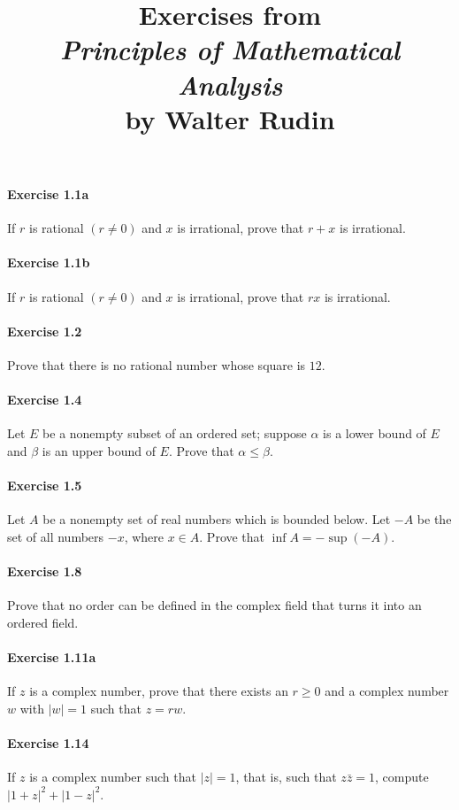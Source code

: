 \documentclass{article}
\title{\textbf{
Exercises from \\
\textit{Principles of Mathematical Analysis} \\
by Walter Rudin
}}
\date{}
\begin{document}
\maketitle

\paragraph{Exercise 1.1a} If $r$ is rational $(r \neq 0)$ and $x$ is irrational, prove that $r+x$ is irrational.

\paragraph{Exercise 1.1b} If $r$ is rational $(r \neq 0)$ and $x$ is irrational, prove that $rx$ is irrational.

\paragraph{Exercise 1.2} Prove that there is no rational number whose square is $12$.

\paragraph{Exercise 1.4} Let $E$ be a nonempty subset of an ordered set; suppose $\alpha$ is a lower bound of $E$ and $\beta$ is an upper bound of $E$. Prove that $\alpha \leq \beta$.

\paragraph{Exercise 1.5} Let $A$ be a nonempty set of real numbers which is bounded below. Let $-A$ be the set of all numbers $-x$, where $x \in A$. Prove that $\inf A=-\sup (-A)$.

\paragraph{Exercise 1.8} Prove that no order can be defined in the complex field that turns it into an ordered field.

\paragraph{Exercise 1.11a} If $z$ is a complex number, prove that there exists an $r\geq 0$ and a complex number $w$ with $| w | = 1$ such that $z = rw$.

\paragraph{Exercise 1.14} If $z$ is a complex number such that $|z|=1$, that is, such that $z \bar{z}=1$, compute $|1+z|^{2}+|1-z|^{2}$.
\end{document}
